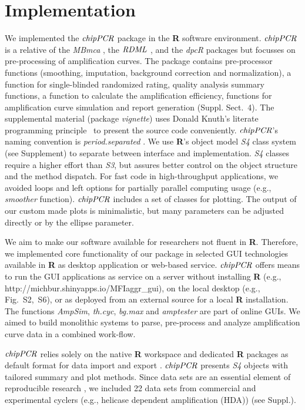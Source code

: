 \documentclass{bioinfo}
\begin{document}
\section{Implementation}
\begin{methods}
We implemented the $\emph{chipPCR}$ package in the \textbf{R} software 
environment. $\emph{chipPCR}$ is a relative of the \emph{MBmca} 
\citep{roediger_RJ_2013}, the $\emph{RDML}$ \citep{blagodatskikh_2014}, and the 
\emph{dpcR} \citep{pabinger_2014} packages but focusses on pre-processing of 
amplification curves. The package contains pre-processor functions (smoothing, 
imputation, background correction and normalization), a function for single-blinded 
randomized rating, quality analysis summary functions, a function to calculate 
the amplification efficiency, functions for amplification curve simulation and 
report 
generation (Suppl. Sect.~4). The supplemental material %
(package \textit{vignette}) uses Donald Knuth's literate programming 
principle~\citep{Knuth1984} to present the source code conveniently. 
$\emph{chipPCR}$'s naming convention is \textit{period.separated} 
\citep{Baaaath_2012}. We use \textbf{R}'s object model \emph{S4} class system 
(see Supplement) to separate between interface and implementation. \emph{S4} 
classes require a higher effort than \emph{S3}, but assures better control on 
the object structure and the method dispatch. For fast code in high-throughput 
applications, we avoided loops and left options for 
partially parallel computing usage (e.g., \textsl{smoother} function). 
$\emph{chipPCR}$ includes a set of classes for plotting. The output of our 
custom made plots is minimalistic, but many parameters can be adjusted directly 
or by the ellipse parameter.

We aim to make our software available for researchers not fluent in 
\textbf{R}. Therefore, we implemented core functionality of our package in 
selected GUI technologies available in \textbf{R} \citep{rodiger_rkward_2012} as 
desktop application or web-based service. $\emph{chipPCR}$ offers means to run 
the GUI applications as service on a server without installing \textbf{R} (e.g., 
http://michbur.shinyapps.io/MFIaggr\_gui), on the local 
desktop (e.g., Fig.~S2,~S6), or as deployed from an external %
source for a local \textbf{R} installation. The functions \textsl{AmpSim}, 
\textsl{th.cyc}, \textsl{bg.max} and \textsl{amptester} are part of online GUIs. 
We aimed to build monolithic systems to parse, pre-process and analyze 
amplification curve data in a combined work-flow. 

$\emph{chipPCR}$ relies solely on the native \textbf{R} 
workspace and dedicated \textbf{R} packages as default format for data import 
and export \citep{perkins_2012,rodiger_rkward_2012,blagodatskikh_2014}. 
$\emph{chipPCR}$ presents \emph{S4} objects with tailored summary and plot 
methods. Since data sets are an essential element of reproducible research 
\citep{Leeper_2014}, we included 22 data sets from commercial and 
experimental cyclers (e.g., helicase 
dependent amplification (HDA)) (see Suppl.).
\end{methods}
\end{document}
